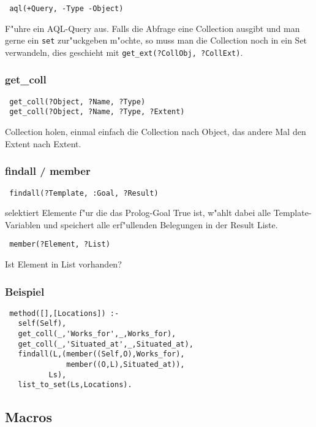 \documentclass[german, 10pt, a4paper, twocolumn]{scrartcl}
\theoremstyle{definition}
\theoremstyle{remark}
\theoremstyle{example}
\begin{document}
\begin{verbatim}
 aql(+Query, -Type -Object)
\end{verbatim}

F"uhre ein AQL-Query aus. Falls die Abfrage eine Collection ausgibt und man gerne ein \texttt{set} zur"uckgeben m"ochte, so muss man die Collection noch in ein Set verwandeln, dies geschieht mit \verb#get_ext(?CollObj, ?CollExt)#.

\subsubsection{get\_coll}

\begin{verbatim}
 get_coll(?Object, ?Name, ?Type)
 get_coll(?Object, ?Name, ?Type, ?Extent)
\end{verbatim}
Collection holen, einmal einfach die Collection nach Object, das andere Mal den Extent nach Extent.

\subsubsection{findall / member}

\begin{verbatim}
 findall(?Template, :Goal, ?Result)
\end{verbatim}

selektiert Elemente f"ur die das Prolog-Goal True ist, w"ahlt dabei alle Template-Variablen und speichert alle erf"ullenden Belegungen in der Result Liste.

\begin{verbatim}
 member(?Element, ?List)
\end{verbatim}

Ist Element in List vorhanden?

\subsubsection{Beispiel}

\begin{verbatim}
 method([],[Locations]) :-
   self(Self),
   get_coll(_,'Works_for',_,Works_for),
   get_coll(_,'Situated_at',_,Situated_at),
   findall(L,(member((Self,O),Works_for),
              member((O,L),Situated_at)),
          Ls),
   list_to_set(Ls,Locations).
\end{verbatim}

\subsection{Macros}
\end{document}
